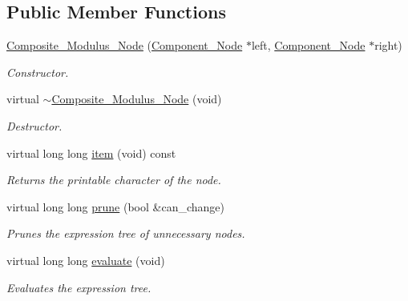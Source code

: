\subsection*{Public Member Functions}
\begin{DoxyCompactItemize}
\item 
\hyperlink{classMadara_1_1Expression__Tree_1_1Composite__Modulus__Node_aee200afd95b45b779042e3f832fde928}{Composite\_\-Modulus\_\-Node} (\hyperlink{classMadara_1_1Expression__Tree_1_1Component__Node}{Component\_\-Node} $\ast$left, \hyperlink{classMadara_1_1Expression__Tree_1_1Component__Node}{Component\_\-Node} $\ast$right)
\begin{DoxyCompactList}\small\item\em Constructor. \item\end{DoxyCompactList}\item 
virtual \hyperlink{classMadara_1_1Expression__Tree_1_1Composite__Modulus__Node_a5b3cf83c7466526a9df35f67b039ccc7}{$\sim$Composite\_\-Modulus\_\-Node} (void)
\begin{DoxyCompactList}\small\item\em Destructor. \item\end{DoxyCompactList}\item 
virtual long long \hyperlink{classMadara_1_1Expression__Tree_1_1Composite__Modulus__Node_aba5aeecd0b3622d928a3e59dd2ad8339}{item} (void) const 
\begin{DoxyCompactList}\small\item\em Returns the printable character of the node. \item\end{DoxyCompactList}\item 
virtual long long \hyperlink{classMadara_1_1Expression__Tree_1_1Composite__Modulus__Node_a1762f6a31a60425c6f99070af3e5d815}{prune} (bool \&can\_\-change)
\begin{DoxyCompactList}\small\item\em Prunes the expression tree of unnecessary nodes. \item\end{DoxyCompactList}\item 
virtual long long \hyperlink{classMadara_1_1Expression__Tree_1_1Composite__Modulus__Node_a565198ed27d20054d38ada6083d4c473}{evaluate} (void)
\begin{DoxyCompactList}\small\item\em Evaluates the expression tree. \item\end{DoxyCompactList}\item 

\end{DoxyCompactItemize}
